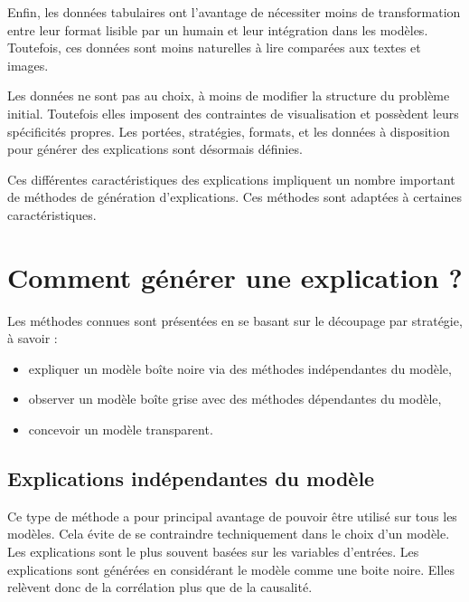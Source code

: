 Enfin, les données tabulaires ont l'avantage de nécessiter moins de transformation entre leur format lisible par un humain et leur intégration dans les modèles. Toutefois, ces données sont moins naturelles à lire comparées aux textes et images.

Les données ne sont pas au choix, à moins de modifier la structure du problème initial. Toutefois elles imposent des contraintes de visualisation et possèdent leurs spécificités propres. Les portées, stratégies, formats, et les données à disposition pour générer des explications sont désormais définies.

Ces différentes caractéristiques des explications impliquent un nombre important de méthodes de génération d'explications. Ces méthodes sont adaptées à certaines caractéristiques.

\section{Comment générer une explication ?}\label{C1:generation}

Les méthodes connues sont présentées en se basant sur le découpage par stratégie, à savoir :
\begin{itemize}
    \item expliquer un modèle boîte noire via des méthodes indépendantes du modèle,
    \item observer un modèle boîte grise avec des méthodes dépendantes du modèle,
    \item concevoir un modèle transparent.
\end{itemize}

\subsection{Explications indépendantes du modèle}

Ce type de méthode a pour principal avantage de pouvoir être utilisé sur tous les modèles. Cela évite de se contraindre techniquement dans le choix d'un modèle. Les explications sont le plus souvent basées sur les variables d'entrées.
Les explications sont générées en considérant le modèle comme une boite noire. Elles relèvent donc de la corrélation plus que de la causalité.

